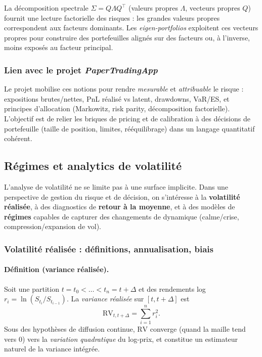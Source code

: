 \documentclass[11pt,a4paper]{article}
\newcommand{\1}{\mathbf{1}}
\begin{document}
La d\'ecomposition spectrale $\Sigma = Q\Lambda Q^\top$ (valeurs propres $\Lambda$, vecteurs propres $Q$) fournit une
lecture factorielle des risques : les grandes valeurs propres correspondent aux facteurs dominants. Les
\emph{eigen-portfolios} exploitent ces vecteurs propres pour construire des portefeuilles align\'es sur des facteurs
ou, \`a l'inverse, moins expos\'es au facteur principal.

\subsubsection{Lien avec le projet \emph{PaperTradingApp}}

Le projet mobilise ces notions pour rendre \emph{mesurable} et \emph{attribuable} le risque : expositions brutes/nettes, PnL r\'ealis\'e vs latent,
drawdowns, VaR/ES, et principes d'allocation (Markowitz, risk parity, d\'ecomposition factorielle). L'objectif est de relier les briques de pricing
et de calibration \`a des d\'ecisions de portefeuille (taille de position, limites, r\'e\'equilibrage) dans un langage quantitatif coh\'erent.

\subsection{R\'egimes et analytics de volatilit\'e}

L'analyse de volatilité ne se limite pas \`a une surface implicite. Dans une perspective de gestion du risque et de
d\'ecision, on s'int\'eresse \`a la \textbf{volatilité r\'ealis\'ee}, \`a des diagnostics de \textbf{retour \`a la moyenne},
et \`a des mod\`eles de \textbf{r\'egimes} capables de capturer des changements de dynamique (calme/crise, compression/expansion de vol).

\subsubsection{Volatilit\'e r\'ealis\'ee : d\'efinitions, annualisation, biais}

\paragraph{D\'efinition (variance r\'ealis\'ee).}
Soit une partition $t=t_0<\dots<t_n=t+\Delta$ et des rendements log
$r_i=\ln(S_{t_i}/S_{t_{i-1}})$. La \emph{variance r\'ealis\'ee} sur $[t,t+\Delta]$ est
\[
\mathrm{RV}_{t,t+\Delta}=\sum_{i=1}^n r_i^2.
\]
Sous des hypoth\`eses de diffusion continue, $\mathrm{RV}$ converge (quand la maille tend vers $0$) vers la \emph{variation quadratique}
du log-prix, et constitue un estimateur naturel de la variance int\'egr\'ee.
\end{document}
